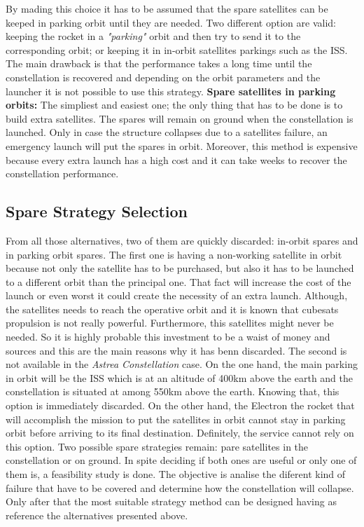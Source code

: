 By mading this choice it has to be assumed that the spare satellites can be keeped in parking orbit until they are needed. Two different option are valid: keeping the rocket in a \textit{"parking"} orbit and then try to send it to the corresponding orbit; or keeping it in in-orbit satellites parkings such as the ISS. The main drawback is that the performance takes a long time until the constellation is recovered and depending on the orbit parameters and the launcher it is not possible to use this strategy.  
\newline
\newline
\textbf{Spare satellites in parking orbits:}
\newline
The simpliest and easiest one; the only thing that has to be done is to build extra satellites. The spares will remain on ground when the constellation is launched. Only in case the structure collapses due to a satellites failure, an emergency launch will put the spares in orbit. Moreover, this method is expensive because every extra launch has a high cost and it can take weeks to recover the constellation performance. 
\newline
\subsection{Spare Strategy Selection}
From all those alternatives, two of them  are quickly discarded: in-orbit spares and in parking orbit spares. The first one is having a non-working satellite in orbit because not only the satellite has to be purchased, but also it has to be launched to a different orbit than the principal one. That fact will increase the cost of the launch or even worst it could create the necessity of an extra launch. Although, the satellites needs to reach the operative orbit and it is known that cubesats propulsion is not really powerful. Furthermore, this satellites might never be needed. So it is highly probable this investment to be a waist of money and sources and this are the main reasons why it has benn discarded.
\newline
\newline
The second is not available in the \textit{Astrea Constellation} case. On the one hand, the main parking in orbit will be the ISS which is at an altitude of 400km above the earth and the constellation is situated at among 550km above the earth. Knowing that, this option is immediately discarded. On the other hand, the Electron the rocket that will accomplish the mission to put the satellites in orbit cannot stay in parking orbit before arriving to its final destination. Definitely, the service cannot rely on this option.
\newline
\newline
Two possible spare strategies remain: pare satellites in the constellation or on ground. In spite deciding if both ones are useful or only one of them is, a feasibility study is done. The objective is analise the diferent kind of failure that have to be covered and determine how the constellation will collapse. Only after that the most suitable strategy method can be designed having as reference the alternatives presented above. 
